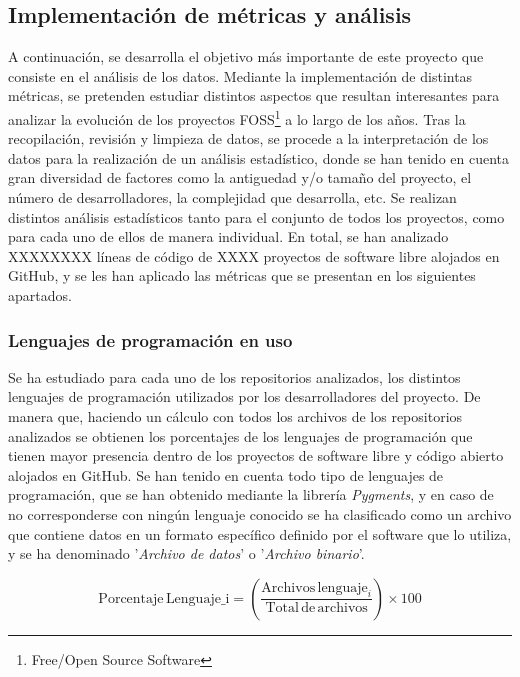 \documentclass[a4paper, 12pt]{book}
\begin{document}
\subsection{Implementación de métricas y análisis}
\label{subsec:metricas}

A continuación, se desarrolla el objetivo más importante de este proyecto que consiste en el análisis de los datos. Mediante la implementación de distintas métricas, se pretenden estudiar distintos aspectos que resultan interesantes para analizar la evolución de los proyectos
FOSS\footnote{Free/Open Source Software} a lo largo de los años.
Tras la recopilación, revisión y limpieza de datos, se procede a la interpretación de los datos para la realización de un análisis estadístico, donde se han tenido en cuenta gran diversidad de factores como la antiguedad y/o tamaño del proyecto, el número de desarrolladores, la
complejidad que desarrolla, etc. Se realizan distintos análisis estadísticos tanto para el conjunto de todos los proyectos, como para cada uno de ellos de manera individual.
En total, se han analizado XXXXXXXX líneas de código de XXXX proyectos de software libre alojados en GitHub, y se les han aplicado las métricas que se presentan en los siguientes apartados.

\subsubsection{Lenguajes de programación en uso}
\label{subsubsec:lenguajes}

Se ha estudiado para cada uno de los repositorios analizados, los distintos lenguajes de programación utilizados por los desarrolladores del proyecto. De manera que, haciendo un cálculo con todos los archivos de los repositorios analizados se obtienen los porcentajes de los lenguajes
de programación que tienen mayor presencia dentro de los proyectos de software libre y código abierto alojados en GitHub. Se han tenido en cuenta todo tipo de lenguajes de programación, que se han obtenido mediante la librería \textit{Pygments},  y en caso de no corresponderse
con ningún lenguaje conocido se ha clasificado como un archivo que contiene datos en un formato específico definido por el software que lo utiliza, y se ha denominado '\textit{Archivo de datos}' o '\textit{Archivo binario}'.

\[\text{Porcentaje} \, \text{Lenguaje_i} = \left( \frac{\text{Archivos} \, \text{lenguaje}_i}{\text{Total} \, \text{de} \, \text{archivos}} \right) \times 100\]
\end{document}

